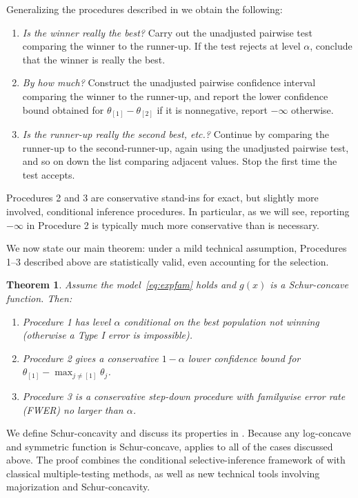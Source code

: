 \documentclass[11pt]{article}
\newtheorem{theorem}[corollary]{Theorem}
\theoremstyle{definition}
\theoremstyle{custom}
\begin{document}
Generalizing the procedures described in  we obtain the following:
\begin{enumerate}
\item {\em Is the winner really the best?} Carry out the unadjusted pairwise test comparing the winner to the runner-up. If the test rejects at level $\alpha$, conclude that the winner is really the best.
\item {\em By how much?} Construct the unadjusted pairwise confidence interval comparing the winner to the runner-up, and report the lower confidence bound obtained for $\theta_{[1]}-\theta_{[2]}$ if it is nonnegative, report $-\infty$ otherwise.
\item {\em Is the runner-up really the second best, etc.?} Continue by comparing the runner-up to the second-runner-up, again using the unadjusted pairwise test, and so on down the list comparing adjacent values. Stop the first time the test accepts.
\end{enumerate}
Procedures 2 and 3 are conservative stand-ins for exact, but slightly more involved, conditional inference procedures. In particular, as we will see, reporting $-\infty$ in Procedure 2 is typically much more conservative than is necessary.

We now state our main theorem: under a mild technical assumption, Procedures 1--3 described above are statistically valid, even accounting for the selection.
\begin{theorem}
Assume the model~\eqref{eq:expfam} holds and $g\left(x\right)$ is a Schur-concave function. Then:
\begin{enumerate}
\item Procedure 1 has level $\alpha$ conditional on the best population not winning (otherwise a Type I error is impossible).
\item Procedure 2 gives a conservative $1-\alpha$ lower confidence bound for $\theta_{[1]} - \max_{j \ne [1]} \theta_{j}$.
\item Procedure 3 is a conservative step-down procedure with familywise error rate (FWER) no larger than $\alpha$.
\end{enumerate}
\label{thm:main}
\end{theorem}

We define Schur-concavity and discuss its properties in . Because any log-concave and symmetric function is Schur-concave,  applies to all of the cases discussed above. The proof combines the conditional selective-inference framework of \citet{Fithian:2014ws} with classical multiple-testing methods, as well as new technical tools involving majorization and Schur-concavity.
\end{document}
